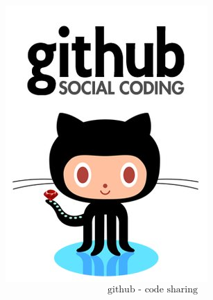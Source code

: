\documentclass{beamer}
\begin{document}
\begin{frame}
\begin{figure}

\centering
\includegraphics[width=0.55\linewidth]{./github}
\[ \mbox{github - code sharing}  \]
\end{figure}
\Large


\end{frame}
\end{document}
